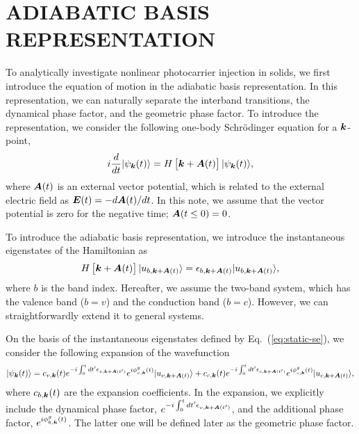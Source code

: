 \chapter{ADIABATIC BASIS REPRESENTATION \label{sec:A_ADIABATIC}}
\label{ch:Adiabatic}
To analytically investigate nonlinear photocarrier injection in solids, we first introduce the equation of motion in the adiabatic basis representation. In this representation, we can naturally separate the interband transitions, the dynamical phase factor, and the geometric phase factor. To introduce the representation, we consider the following one-body Schr\"odinger equation for a $\boldsymbol k$-point,
\begin{equation}
i \frac{d}{dt} | \psi_{\boldsymbol k}(t) \rangle = H \left [\boldsymbol k + \boldsymbol A(t) \right ] | \psi_{\boldsymbol k}(t) \rangle,
\label{eqn:tdse00}
\end{equation}
where $\boldsymbol A(t)$ is an external vector potential, which is related to the external electric field as $\boldsymbol E(t)=-d\boldsymbol A(t)/dt$. In this note, we assume that the vector potential is zero for the negative time; $\boldsymbol A(t\leq 0)=0$.

To introduce the adiabatic basis representation, we introduce the instantaneous eigenstates of the Hamiltonian as
\begin{align}
H\left [\boldsymbol k + \boldsymbol A(t) \right ] |u_{b,\boldsymbol k+\boldsymbol A(t)}\rangle = \epsilon_{b,\boldsymbol k + \boldsymbol A(t)}|u_{b,\boldsymbol k+\boldsymbol A(t)}\rangle,
\label{eq:static-se}
\end{align}
where $b$ is the band index. Hereafter, we assume the two-band system, which has the valence band ($b=v$) and the conduction band ($b=c$). However, we can straightforwardly extend it to general systems.

On the basis of the instantaneous eigenstates defined by Eq.~(\ref{eq:static-se}), we consider the following expansion of the wavefunction
\begin{align}
|\psi_{\boldsymbol k}(t)\rangle = c_{v,\boldsymbol k}(t) e^{-i\int^t_0dt' \epsilon_{v,\boldsymbol k+ \boldsymbol A(t')}} e^{i\phi^g_{v,\boldsymbol k}(t)} |u_{v,\boldsymbol k+\boldsymbol A(t)}\rangle
+c_{c,\boldsymbol k}(t) e^{-i\int^t_0dt' \epsilon_{c,\boldsymbol k+ \boldsymbol A(t')}} e^{i\phi^g_{c,\boldsymbol k}(t)} |u_{c,\boldsymbol k+\boldsymbol A(t)}\rangle,
\label{eq:ansatz}
\end{align}
where $c_{b,\boldsymbol k}(t)$ are the expansion coefficients. In the expansion, we explicitly include the dynamical phase factor, $e^{-i\int^t_0dt' \epsilon_{v,\boldsymbol k+ \boldsymbol A(t')}}$, and the additional phase factor, $e^{i\phi^g_{b,\boldsymbol k}(t)}$. The latter one will be defined later as the geometric phase factor.

